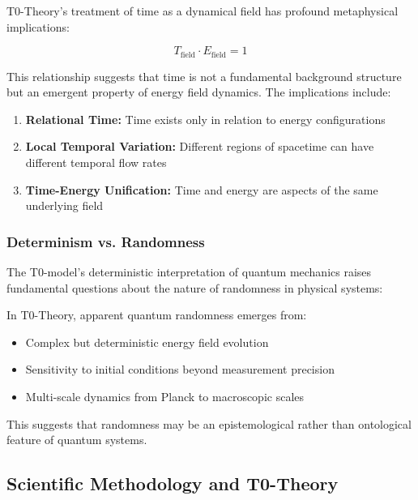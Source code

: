 \documentclass[12pt,a4paper]{article}
\theoremstyle{definition}
\begin{document}
	T0-Theory's treatment of time as a dynamical field has profound metaphysical implications:
	
	\begin{equation}
		T_{\text{field}} \cdot E_{\text{field}} = 1
	\end{equation}
	
	This relationship suggests that time is not a fundamental background structure but an emergent property of energy field dynamics. The implications include:
	
	\begin{enumerate}
		\item \textbf{Relational Time:} Time exists only in relation to energy configurations
		\item \textbf{Local Temporal Variation:} Different regions of spacetime can have different temporal flow rates
		\item \textbf{Time-Energy Unification:} Time and energy are aspects of the same underlying field
	\end{enumerate}
	
	\subsubsection{Determinism vs. Randomness}
	
	The T0-model's deterministic interpretation of quantum mechanics raises fundamental questions about the nature of randomness in physical systems:
	
	\begin{philosophy}
		In T0-Theory, apparent quantum randomness emerges from:
		\begin{itemize}
			\item Complex but deterministic energy field evolution
			\item Sensitivity to initial conditions beyond measurement precision
			\item Multi-scale dynamics from Planck to macroscopic scales
		\end{itemize}
		
		This suggests that randomness may be an epistemological rather than ontological feature of quantum systems.
	\end{philosophy}
	
	\subsection{Scientific Methodology and T0-Theory}
	
\end{document}
